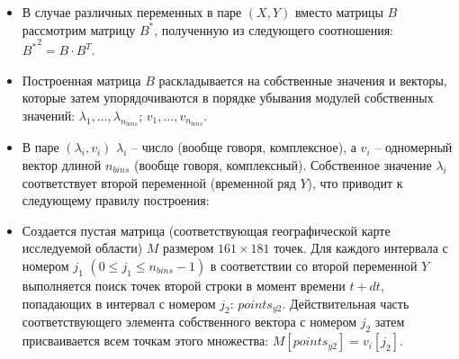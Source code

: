 \begin{itemize}
\begin{itemize}
		\item В случае различных переменных в паре $(X,Y)$ вместо матрицы $B$ рассмотрим матрицу $B^*$, полученную из следующего соотношения: ${B^*}^2= B \cdot B^T$.
		
		\item Построенная матрица $B$ раскладывается на собственные значения и векторы, которые затем упорядочиваются в порядке убывания модулей собственных значений: $\lambda_1,\dots,\lambda_{n_{bins}}$; $v_1,\dots,v_{n_{bins}}$.
		
		\item В паре $(\lambda_i, v_i)$ $\lambda_i$ -- число (вообще говоря, комплексное), а $v_i$ -- одномерный вектор длиной $n_{bins}$ (вообще говоря, комплексный). Собственное значение $\lambda_i$ соответствует второй переменной (временной ряд $Y$), что приводит к следующему правилу построения: 
		
		\item Создается пустая матрица (соответствующая географической карте исследуемой области) $M$ размером $161 \times 181$ точек. Для каждого интервала с номером $j_1$ $(0 \leqslant j_1 \leqslant n_{bins}-1)$ в соответствии со второй переменной $Y$ выполняется поиск точек второй строки в момент времени $t+dt$, попадающих в интервал с номером $j_2$: $points_{y2}$. Действительная часть соответствующего элемента собственного вектора с номером $j_2$ затем присваивается всем точкам этого множества: $M[points_{y2}] = v_i[j_2]$.
	\end{itemize}
\end{itemize}




